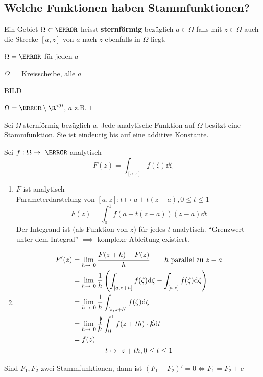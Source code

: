 \subsection{Welche Funktionen haben Stammfunktionen?}
\begin{def*}[note = sternförmig , index = sternförmig]
	Ein Gebiet $\Omega \subset \C$ heisst \textbf{sternförmig} bezüglich $a \in \Omega$ falls mit $z \in \Omega$ auch die Strecke $[a,z]$ von $a$ nach $z$ ebenfalls in $\Omega$ liegt.
\end{def*}
\begin{bsp}
	$\Omega = \C$ für jeden $a$
\end{bsp}
\begin{bsp}
	$\Omega =$ Kreisscheibe, alle $a$
\end{bsp}
\begin{bsp}
	BILD
\end{bsp}
\begin{bsp}
	$\Omega = \C \setminus \R^{<0}$, $a$ z.B. $1$
\end{bsp}
\begin{satz*}
	Sei $\Omega$ sternförmig bezüglich $a$. Jede analytische Funktion auf $\Omega$ besitzt eine Stammfunktion. Sie ist eindeutig bis auf eine additive Konstante.
	\begin{bew}[note = Beweis und Formel]
		Sei $f: \Omega \rightarrow \C$ analytisch
		\[ F(z) = \int_{[a,z]} f(\zeta) \dd \zeta \]
		\begin{enumerate}[label = (\alph*)]
			\item $F$ ist analytisch \\
				Parameterdarstelung von $[a,z] : t \mapsto a + t(z-a) , 0 \leq t \leq 1$
				\[ F(z) = \int_0^1 f(a + t(z-a)) (z-a) \dd t \]
				Der Integrand ist (als Funktion von $z$) für jedes $t$ analytisch. \enquote{Grenzwert unter dem Integral} $\implies$ komplexe Ableitung existiert.
			\item \begin{gather*}
				\begin{split}
					F'(z)
						&= \lim_{h \rightarrow 0} \frac{F(z+h) - F(z)}{h} \qquad h \text{ parallel zu } z-a \\
						&= \lim_{h \rightarrow 0} \frac{1}{h} \left( \int_{[a,z+h]} f(\zeta) \dd \zeta - \int_{[a,z]} f(\zeta) \dd \zeta \right) \\
						&= \lim_{h \rightarrow 0} \frac{1}{h} \int_{[z,z+h]} f(\zeta) \dd \zeta \\
						&= \lim_{h \rightarrow 0} \cancel{\frac{1}{h}} \int_0^1 f(z + th) \cdot \cancel{h} \dd t \\
						&= f(z)
				\end{split} \\
				t \mapsto z + th , 0 \leq t \leq 1
			\end{gather*}
		\end{enumerate}
	\end{bew}
	\begin{bew}[note = Eindeutigkeit]
		Sind $F_1 , F_2$ zwei Stammfunktionen, dann ist $(F_1 - F_2)' = 0 \iff F_1 = F_2 + c$
	\end{bew}
\end{satz*}
